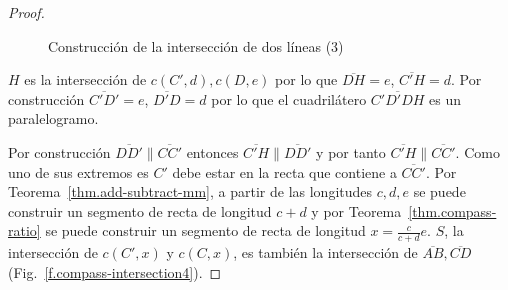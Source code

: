 \begin{proof}
\begin{figure}[b]
\begin{center}
\end{center}
\caption{Construcción de la intersección de dos líneas (3)}\label{f.compass-intersection3}
\end{figure}

$H$ es la intersección de $c(C',d), c(D,e)$ por lo que $\overline{DH}=e$, $\overline{C'H}=d$. Por construcción $\overline{C'D'} = e$, $\overline{D'D}=d$ por lo que el cuadrilátero $\overline{C'D'DH}$ es un paralelogramo. 

Por construcción $\overline{DD'}\parallel\overline{CC'}$ entonces $\overline{C'H}\parallel \overline{DD'}$ y por tanto $\overline{C'H}\parallel\overline{CC'}$. Como uno de sus extremos es $C'$ debe estar en la recta que contiene a $\overline{CC'}$. Por Teorema~\ref{thm.add-subtract-mm}, a partir de las longitudes $c,d,e$ se puede construir un segmento de recta de longitud $c+d$ y por Teorema~\ref{thm.compass-ratio} se puede construir un segmento de recta de longitud $x=\displaystyle\frac{c}{c+d}e$. $S$, la intersección de $c(C',x)$ y $c(C,x)$, es también la intersección de $\overline{AB}, \overline{CD}$ (Fig.~\ref{f.compass-intersection4}).
\end{proof}

